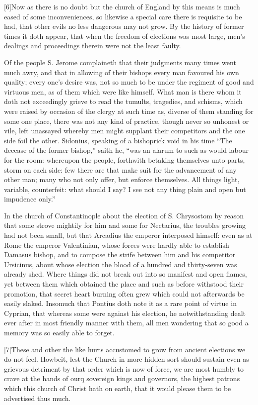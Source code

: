 [6]Now as there is no doubt but the church of England by this means is much eased of some inconveniences, so likewise a special care there is requisite to be had, that other evils no less dangerous may not grow. By the history of former times it doth appear, that when the freedom of elections was most large, men’s dealings and proceedings therein were not the least faulty.

Of the people S. Jerome complaineth that their judgments many times went much awry, and that in allowing of their bishops every man favoured his own quality; every one’s desire was, not so much to be under the regiment of good and virtuous men, as of them which were like himself. What man is there whom it doth not exceedingly grieve to read the tumults, tragedies, and schisms, which were raised by occasion of the clergy at such time as, diverse of them standing for some one place, there was not any kind of practice, though never so unhonest or vile, left unassayed whereby men might supplant their competitors and the one side foil the other. Sidonius, speaking of a bishoprick void in his time “The decease of the former bishop,” saith he, “was an alarum to such as would labour for the room: whereupon the people, forthwith betaking themselves unto parts, storm on each side: few there are that make suit for the advancement of any other man; many who not only offer, but enforce themselves. All things light, variable, counterfeit: what should I say? I see not any thing plain and open but impudence only.”


In the church of Constantinople about the election of S. Chrysostom by reason that some strove mightily for him and some for Nectarius, the troubles growing had not been small, but that Arcadius the emperor interposed himself: even as at Rome the emperor Valentinian, whose forces were hardly able to establish Damasus bishop, and to compose the strife between him and his competitor Ursicinus, about whose election the blood of a hundred and thirty-seven was already shed. Where things did not break out into so manifest and open flames, yet between them which obtained the place and such as before withstood their promotion, that secret heart burning often grew which could not afterwards be easily slaked. Insomuch that Pontius doth note it as a rare point of virtue in Cyprian, that whereas some were against his election, he notwithstanding dealt ever after in most friendly manner with them, all men wondering that so good a memory was so easily able to forget.

[7]These and other the like hurts accustomed to grow from ancient elections we do not feel. Howbeit, lest the Church in more hidden sort should sustain even as grievous detriment by that order which is now of force, we are most humbly to crave at the hands of ourq sovereign kings and governors, the highest patrons which this church of Christ hath on earth, that it would please them to be advertised thus much.


